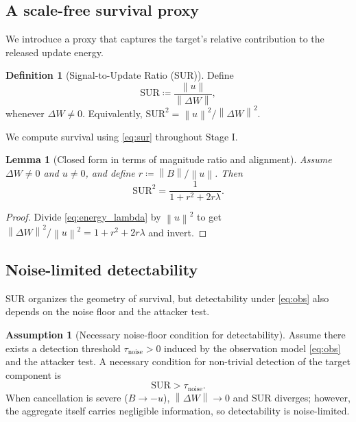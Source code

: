 \documentclass{article}
\theoremstyle{plain}
\newtheorem{lemma}{Lemma}
\theoremstyle{definition}
\newtheorem{definition}{Definition}
\newtheorem{assumption}{Assumption}
\theoremstyle{remark}
\numberwithin{theorem}{section}
\numberwithin{definition}{section}
\numberwithin{remark}{section}
\numberwithin{lemma}{section}
\numberwithin{assumption}{section}
\newcommand{\norm}[1]{\left\lVert #1 \right\rVert}
\newcommand{\utarget}{u}
\begin{document}
\subsection{A scale-free survival proxy}

We introduce a proxy that captures the target's relative contribution to the released update energy.

\begin{definition}[Signal-to-Update Ratio (SUR)]
\label{def:sur}
Define
\begin{equation}
\label{eq:sur}
\mathrm{SUR} \coloneqq \frac{\norm{\utarget}}{\norm{\Delta W}},
\end{equation}
whenever $\Delta W\neq 0$. Equivalently, $\mathrm{SUR}^2=\norm{\utarget}^2/\norm{\Delta W}^2$.
\end{definition}
\noindent We compute survival using \eqref{eq:sur} throughout Stage I.

\begin{lemma}[Closed form in terms of magnitude ratio and alignment]
\label{prop:sur_closed}
Assume $\Delta W\neq 0$ and $\utarget\neq 0$, and define $r\coloneqq \norm{B}/\norm{\utarget}$.
Then
\begin{equation}
\label{eq:sur_r}
\mathrm{SUR}^2 = \frac{1}{1+r^2+2r\lambda}.
\end{equation}
\end{lemma}

\begin{proof}
Divide \eqref{eq:energy_lambda} by $\norm{\utarget}^2$ to get $\norm{\Delta W}^2/\norm{\utarget}^2 = 1+r^2+2r\lambda$ and invert.
\end{proof}

\subsection{Noise-limited detectability}

SUR organizes the geometry of survival, but detectability under \eqref{eq:obs} also depends on the noise floor and the attacker test.

\begin{assumption}[Necessary noise-floor condition for detectability]
\label{cond:noise}
Assume there exists a detection threshold $\tau_{\mathrm{noise}}>0$ induced by the observation model \eqref{eq:obs} and the attacker test.
A necessary condition for non-trivial detection of the target component is
\begin{equation}
\label{eq:noise_cond}
\mathrm{SUR} > \tau_{\mathrm{noise}}.
\end{equation}
When cancellation is severe ($B \to -\utarget$), $\norm{\Delta W} \to 0$ and $\mathrm{SUR}$ diverges; however, the aggregate itself carries negligible information, so detectability is noise-limited.
\end{assumption}
\end{document}
